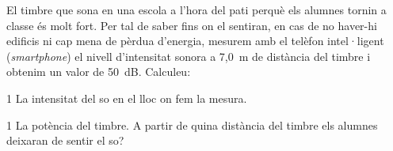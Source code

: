 El timbre que sona en una escola a l'hora del pati perquè els alumnes tornin a classe és molt fort. Per tal de saber fins on el sentiran, en cas de no haver-hi edificis ni cap mena de pèrdua d'energia, mesurem amb el telèfon intel·ligent (\textit{smartphone}) el nivell d'intensitat sonora a 7,0~m de distància del timbre i obtenim un valor de 50~dB. Calculeu:

\begin{apartat}{1}
La intensitat del so en el lloc on fem la mesura.
\end{apartat}

\begin{apartat}{1}
La potència del timbre. A partir de quina distància del timbre els alumnes deixaran de sentir el so?
\end{apartat}

